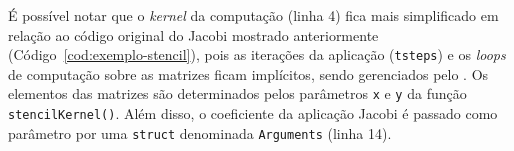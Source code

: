 
É possível notar que o \textit{kernel} da computação \stencil (linha 4) fica mais simplificado em relação ao
código original do Jacobi mostrado anteriormente (Código~\ref{cod:exemplo-stencil}), pois as iterações da aplicação
(\texttt{tsteps}) e os \textit{loops} de computação sobre as matrizes ficam implícitos, sendo
gerenciados pelo \fw. Os elementos das matrizes são determinados pelos
parâmetros \texttt{x} e \texttt{y} da função \texttt{stencilKernel()}. Além disso, o coeficiente
da aplicação Jacobi é passado como parâmetro por uma \texttt{struct} denominada
\texttt{Arguments} (linha 14).


